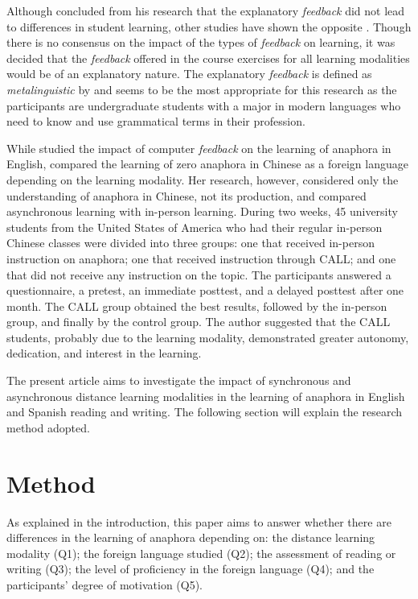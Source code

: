 \documentclass{textolivre}
\begin{document}
Although \textcite{liu_acquisition_2010} concluded from his research that the explanatory
\emph{feedback} did not lead to differences in student learning, other
studies have shown the opposite \cite{lyster_corrective_1997,heift_corrective_2004,mackey_pushing_2006}. 
Though there is no consensus on the impact of the
types of \emph{feedback} on learning, it was decided that the
\emph{feedback} offered in the course exercises for all learning
modalities would be of an explanatory nature. The explanatory
\emph{feedback} is defined as \emph{metalinguistic} by \textcite[p.~47]{lyster_corrective_1997}
and seems to be the most appropriate for this research as
the participants are undergraduate students with a major in modern
languages who need to know and use grammatical terms in their
profession.

While \textcite{liu_acquisition_2010} studied the impact of computer \emph{feedback} on the
learning of anaphora in English, \textcite{li_engaging_2014} compared the learning of zero
anaphora in Chinese as a foreign language depending on the learning
modality. Her research, however, considered only the understanding of
anaphora in Chinese, not its production, and compared asynchronous
learning with in-person learning. During two weeks, 45 university
students from the United States of America who had their regular
in-person Chinese classes were divided into three groups: one that
received in-person instruction on anaphora; one that received
instruction through CALL; and one that did not receive any instruction
on the topic. The participants answered a questionnaire, a pretest, an
immediate posttest, and a delayed posttest after one month. The CALL
group obtained the best results, followed by the in-person group, and
finally by the control group. The author suggested that the CALL
students, probably due to the learning modality, demonstrated greater
autonomy, dedication, and interest in the learning.

The present article aims to investigate the impact of synchronous and
asynchronous distance learning modalities in the learning of anaphora in
English and Spanish reading and writing. The following section will
explain the research method adopted.


\section{Method}\label{sec-method}
As explained in the introduction, this paper aims to answer whether
there are differences in the learning of anaphora depending on: the
distance learning modality (Q1); the foreign language studied (Q2); the
assessment of reading or writing (Q3); the level of proficiency in the
foreign language (Q4); and the participants' degree of motivation (Q5).
\end{document}
